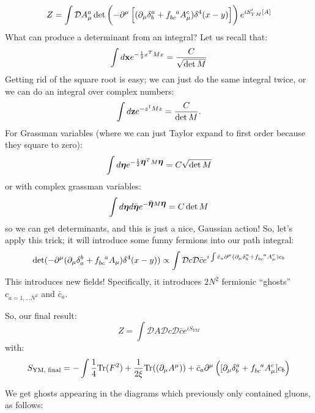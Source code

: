 \begin{equation}
    Z = \int \mathcal{D}A_\mu^a \det\left(-\p^\mu\left[(\p_\mu \delta^a_b + f_{bc}^{\sp\sp a}A_\mu^c)\delta^4(x-y)\right]\right)e^{iS'_{YM}[A]}
\end{equation}
What can produce a determinant from an integral? Let us recall that:
\begin{equation}
    \int d\mathbf{x}e^{-\frac{1}{2}x^T M x} = \frac{C}{\sqrt{\det M}}
\end{equation}
Getting rid of the square root is easy; we can just do the same integral twice, or we can do an integral over complex numbers:
\begin{equation}
    \int d\mathbf{z}e^{-z^\dagger M z} = \frac{C}{\det M}.
\end{equation}
For Grassman variables (where we can just Taylor expand to first order because they square to zero):
\begin{equation}
    \int d\mbox{\boldmath$ \eta $} e^{-\frac{1}{2}\mbox{\boldmath$ \eta $}^T M \mbox{\boldmath$ \eta $}} = C\sqrt{\det M}
\end{equation}
or with complex grassman variables:
\begin{equation}
    \int d\mbox{\boldmath$ \eta $} d\bar{\mbox{\boldmath$ \eta $}} e^{-\bar{\mbox{\boldmath$ \eta $}}M \mbox{\boldmath$ \eta $}} = C\det M
\end{equation}
so we can get determinants, and this is just a nice, Gaussian action! So, let's apply this trick; it will introduce some funny fermions into our path integral:
\begin{equation}
    \det(-\p^\mu(\p_\mu \delta^b_a + f_{bc}^{\sp\sp a}A_\mu)\delta^4(x-y)) \propto \int \mathcal{D}c \mathcal{D}\bar{c} e^{i\int \bar{c}_a\p^\mu(\p_\mu \delta^a_b + f_{bc}^{\sp\sp a}A_\mu^c)c_b}
\end{equation}
This introduces new fields! Specifically, it introduces $2N^2$ fermionic ``ghosts'' $c_{a=1, \ldots N^2}$ and $\bar{c}_a$.

So, our final result:
\begin{equation}
    Z = \int \mathcal{D}A \mathcal{D}c \mathcal{D}\bar{c} e^{iS_{YM}}
\end{equation}
with:
\begin{equation}
    S_{\text{YM, final}} = -\int \frac{1}{4}\Tr(F^2) + \frac{1}{2\xi}\Tr((\p_\mu A^\mu)) + \bar{c}_a\p^\mu \left([\p_\mu \delta^a_b + f_{bc}^{\sp\sp a} A_\mu^c]c_b\right)
\end{equation}

We get ghosts appearing in the diagrams which previously only contained gluons, as follows:

